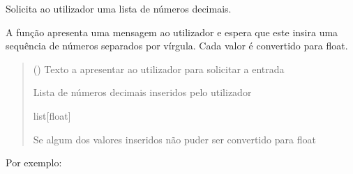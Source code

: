 \documentclass[letterpaper,10pt,portuges]{sphinxmanual}
\begin{document}
\begin{fulllineitems}
\label{\detokenize{main:main.pedir_lista_floats}}
\pysigstartsignatures
\pysiglinewithargsret
{}
{}
{}
\pysigstopsignatures
\sphinxAtStartPar
Solicita ao utilizador uma lista de números decimais.

\sphinxAtStartPar
A função apresenta uma mensagem ao utilizador e espera que este
insira uma sequência de números separados por vírgula. Cada valor
é convertido para float.
\begin{quote}\begin{description}
\sphinxAtStartPar
{} () \textendash{} Texto a apresentar ao utilizador para solicitar a entrada

\sphinxAtStartPar
Lista de números decimais inseridos pelo utilizador

\sphinxAtStartPar
list{[}float{]}

\sphinxAtStartPar
{} \textendash{} Se algum dos valores inseridos não puder ser
convertido para float

\end{description}\end{quote}

\sphinxAtStartPar
Por exemplo:

\begin{sphinxVerbatim}[commandchars=\\\{\}]
\end{sphinxVerbatim}

\end{fulllineitems}

\end{document}
